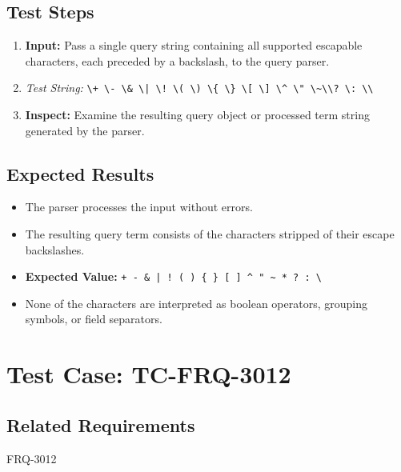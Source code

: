\documentclass{article}
\begin{document}
\subsection*{Test Steps}
\begin{enumerate}
    \item \textbf{Input:} Pass a single query string containing all supported escapable characters, each preceded by a backslash, to the query parser.
    \item[] \textit{Test String:} 
    \texttt{\textbackslash+ \textbackslash- \textbackslash\& \textbackslash| \textbackslash! \textbackslash( \textbackslash) \textbackslash\{ \textbackslash\} \textbackslash[ \textbackslash] \textbackslash\^{} \textbackslash" \textbackslash\textasciitilde \textbackslash* \textbackslash? \textbackslash: \textbackslash\textbackslash}
    \item \textbf{Inspect:} Examine the resulting query object or processed term string generated by the parser.
\end{enumerate}

\subsection*{Expected Results}
\begin{itemize}
    \item The parser processes the input without errors.
    \item The resulting query term consists of the characters stripped of their escape backslashes.
    \item \textbf{Expected Value:} \texttt{+ - \& | ! ( ) \{ \} [ ] \^{} " \textasciitilde{} * ? : \textbackslash}
    \item None of the characters are interpreted as boolean operators, grouping symbols, or field separators.
\end{itemize}




\section{Test Case: TC-FRQ-3012}
\subsection*{Related Requirements}
FRQ-3012
\end{document}
